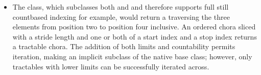 \documentclass[letterpaper,10pt,english]{jupyterBook}
\begin{document}
\begin{itemize}
\begin{itemize}
\item {} 
\sphinxAtStartPar
The  class, which subclasses both  and  and therefore supports full  still count\sphinxhyphen{}based indexing \sphinxhyphen{} for example,  would return a  traversing the three elements from position two to position four inclusive. An ordered chora sliced with a stride length and one or both of a start index and a stop index returns a tractable chora. The addition of both limits and countability permits iteration, making  an implicit subclass of the native   base class; however, only tractables with lower limits can be successfully iterated across.

\end{itemize}

\end{itemize}
\end{document}

